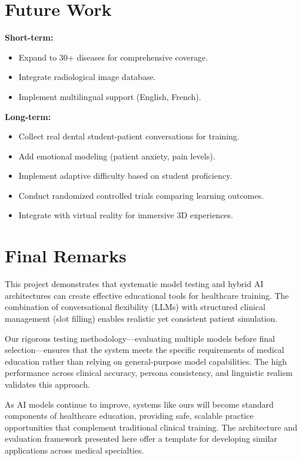\documentclass[runningheads,a4paper,11pt]{report}
\begin{document}
\section{Future Work}

\textbf{Short-term:}
\begin{itemize}
\item Expand to 30+ diseases for comprehensive coverage.
\item Integrate radiological image database.
\item Implement multilingual support (English, French).
\end{itemize}

\textbf{Long-term:}
\begin{itemize}
\item Collect real dental student-patient conversations for training.
\item Add emotional modeling (patient anxiety, pain levels).
\item Implement adaptive difficulty based on student proficiency.
\item Conduct randomized controlled trials comparing learning outcomes.
\item Integrate with virtual reality for immersive 3D experiences.
\end{itemize}

\section{Final Remarks}

This project demonstrates that systematic model testing and hybrid AI architectures can create effective educational tools for healthcare training. The combination of conversational flexibility (LLMs) with structured clinical management (slot filling) enables realistic yet consistent patient simulation.

Our rigorous testing methodology—evaluating multiple models before final selection—ensures that the system meets the specific requirements of medical education rather than relying on general-purpose model capabilities. The high performance across clinical accuracy, persona consistency, and linguistic realism validates this approach.

As AI models continue to improve, systems like ours will become standard components of healthcare education, providing safe, scalable practice opportunities that complement traditional clinical training. The architecture and evaluation framework presented here offer a template for developing similar applications across medical specialties.
\end{document}
